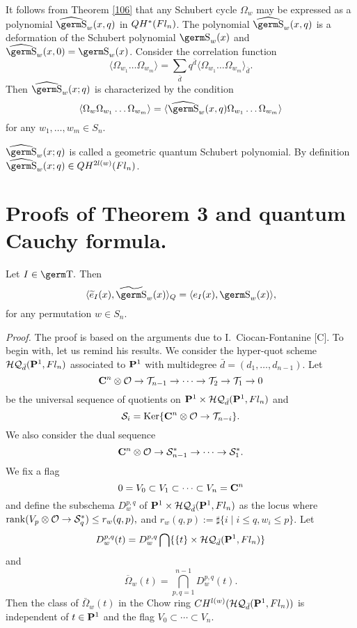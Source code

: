 {{It follows from Theorem \ref{106} that any Schubert cycle $\Omega_w$ 
may be expressed as a 
polynomial $\wh{\s}_w(x ,q)$ in $QH^*(\hbox{$Fl_n$} )$. The polynomial 
$\wh{\s}_w(x ,q)$ is a deformation of the Schubert polynomial 
$\s_w(x )$ and $\wh{\s}_w(x ,0)=\s_w(x)$. Consider the correlation 
function
$$\langle\Omega_{w_1}\ldots\Omega_{w_m}\rangle =\sum_{\bar d}q^{\bar 
d}\langle\Omega_{w_1}\ldots\Omega_{w_m}\rangle_{\bar d}.
$$
Then $\wh{\s}_w(x ;q)$ is characterized by the condition
$$\langle\Omega_w\Omega_{w_1}\ldots\Omega_{w_m}\rangle 
=\langle\wh{\s}_w(x ,q)\Omega_{w_1}\ldots\Omega_{w_m}\rangle
$$
for any $w_1,\ldots ,w_m\in S_n$.

$\wh{\s}_w(x ;q)$ is called a geometric quantum Schubert polynomial. By 
definition $\wh{\s}_w(x;q)\in QH^{2l(w)}(\Fl )$.

\section{Proofs of Theorem 3 and quantum Cauchy formula.}

\begin{th} Let $I\in \t.$ Then 
\[ \langle \wt{e}_I(x),
\wt{\s}_w (x) \rangle _Q 
= \langle e_I(x), \s_w(x) \rangle , \] 
for any permutation $w\in S_n.$ 
\end{th} 
{\it Proof.} The proof is based on the arguments 
due to I.~Ciocan-Fontanine [C]. 
To begin with, let us remind his results. We consider 
the hyper-quot scheme 
${\cal HQ}_{\bar{d}}({\bf P}^1,Fl_n)$ 
associated to ${\bf P}^1$ with multidegree 
$\bar{d} = (d_1,\ldots,d_{n-1}).$ 
Let 
\[ {\bf C}^n \otimes {\cal O} \rightarrow 
{\cal T}_{n-1} \rightarrow \cdots \rightarrow 
{\cal T}_2 \rightarrow {\cal T}_1 \rightarrow 0 \] 
be the universal sequence of quotients on 
${\bf P}^1 \times {\cal HQ}_{\bar{d}}({\bf P}^1,Fl_n)$ 
and
$${\cal S}_i = {\rm Ker}\{ {\bf C}^n \otimes {\cal O} 
\rightarrow {\cal T}_{n-i} \} .
$$ 
We also consider the dual sequence 
\[ {\bf C}^n \otimes {\cal O} \rightarrow 
{\cal S}_{n-1}^{\ast} \rightarrow \cdots \rightarrow 
{\cal S}_1^{\ast}. \] 
We fix a flag 
\[ 0=V_0 \subset V_1 \subset \cdots \subset V_n= {\bf C}^n \] 
and define the subschema $D_w^{p,q}$ of 
${\bf P}^1 \times {\cal HQ}_{\bar{d}}({\bf P}^1,Fl_n)$ 
as the locus where ${\rm rank}(V_p \otimes {\cal O} \rightarrow 
{\cal S}_q^{\ast})\leq r_w(q,p),$ 
and $r_w(q,p):=\sharp \{ i \mid i\leq q, w_i\leq p \}.$ 
Let 
\[ D_w^{p,q}(t) = D_w^{p,q} \bigcap \{ \{t \} \times 
{\cal HQ}_{\bar{d}}({\bf P}^1,Fl_n) \} \] 
and 
\[ \overline{\Omega}_w(t) = \bigcap_{p,q=1}^{n-1}
D_w^{p,q}(t). \] 
Then the class of $\bar{\Omega}_w(t)$ in the Chow ring
$CH^{l(w)}({\cal HQ}_{\bar{d}}({\bf P}^1,Fl_n))$ is 
independent of $t\in {\bf P}^1$ and the flag 
$V_0\subset \cdots \subset V_n.$ 

}}
